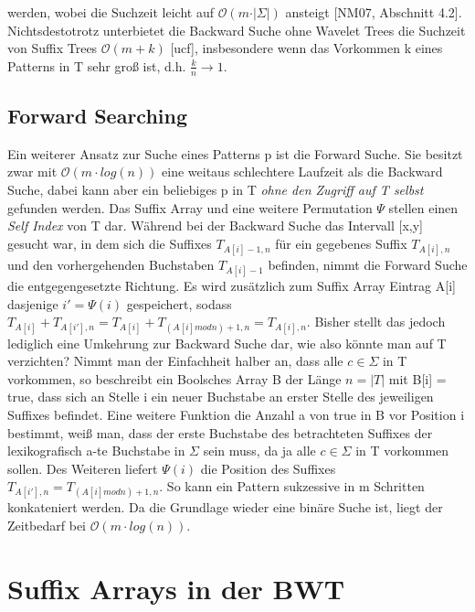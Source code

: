 \documentclass[12pt,twoside]{article}
\begin{document}
werden, wobei die Suchzeit leicht auf $\mathcal{O}(m \cdot \vert \Sigma \vert)$ ansteigt [NM07, Abschnitt 4.2]. Nichtsdestotrotz unterbietet die Backward Suche ohne Wavelet Trees die Suchzeit von Suffix Trees $\mathcal{O}(m+k)$ [ucf], insbesondere wenn das Vorkommen k eines Patterns in T sehr groß ist, d.h. $\frac{k}{n} \rightarrow 1$.

\subsection{Forward Searching}
Ein weiterer Ansatz zur Suche eines Patterns p ist die Forward Suche. Sie besitzt zwar mit $\mathcal{O}(m\cdot log(n))$ eine weitaus schlechtere Laufzeit als die Backward Suche, dabei kann aber ein beliebiges p in T \textit{ohne den Zugriff auf T selbst} gefunden werden. Das Suffix Array und eine weitere Permutation $\Psi$ stellen einen \textit{Self Index} von T dar. Während bei der Backward Suche das Intervall [x,y] gesucht war, in dem sich die Suffixes $T_{A[i]-1,n}$ für ein gegebenes Suffix $T_{A[i],n}$ und den vorhergehenden Buchstaben $T_{A[i]-1}$ befinden, nimmt die Forward Suche die entgegengesetzte Richtung. Es wird zusätzlich zum Suffix Array Eintrag A[i] dasjenige $i' = \Psi(i)$ gespeichert, sodass $T_{A[i]} + T_{A[i'],n} = T_{A[i]} + T_{(A[i] mod n)+1,n} = T_{A[i],n}$. Bisher stellt das jedoch lediglich eine Umkehrung zur Backward Suche dar, wie also könnte man auf T verzichten? Nimmt man der Einfachheit halber an, dass alle $c \in \Sigma$ in T vorkommen, so beschreibt ein Boolsches Array B der Länge $n = \vert T \vert$ mit B[i] = true, dass sich an Stelle i ein neuer Buchstabe an erster Stelle des jeweiligen Suffixes befindet. Eine weitere Funktion die Anzahl a von true in B vor Position i bestimmt, weiß man, dass der erste Buchstabe des betrachteten Suffixes der lexikografisch a-te Buchstabe in $\Sigma$ sein muss, da ja alle $c \in \Sigma$ in T vorkommen sollen. Des Weiteren liefert $\Psi(i)$ die Position des Suffixes $T_{A[i'],n} = T_{(A[i] mod n)+1,n}$. So kann ein Pattern sukzessive in m Schritten konkateniert werden. Da die Grundlage wieder eine binäre Suche ist, liegt der Zeitbedarf bei $\mathcal{O}(m\cdot log(n))$.

\section{Suffix Arrays in der BWT}
\end{document}
